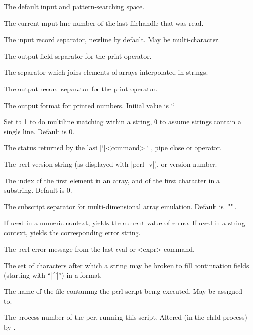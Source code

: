 \begin{enum}{1cm}

The default input and pattern-searching space.

The current input line number of the last filehandle that was read.

The input record separator, newline by default. May be multi-character.

The output field separator for the print operator.

The separator which joins elements of arrays interpolated in strings.

The output record separator for the print operator.

The output format for printed numbers. Initial value is ``|%

Set to 1 to do multiline matching within a string, 0 to assume strings
contain a single line. Default is 0. 

The status returned by the last |`|<command>|`|, pipe close or
 operator. 

The perl version string (as displayed with |perl -v|), or version number.

The index of the first element in an array, and of the first character
in a substring. Default is 0. 

The subscript separator for multi-dimensional array emulation. Default
is |""|. 

If used in a numeric context, yields the current value of errno. If
used in a string context, yields the corresponding error string. 

The perl error message from the last eval or  <expr> command.

The set of characters after which a string may be broken to fill
continuation fields (starting with ``|^|'') in a format. 

The name of the file containing the perl script being executed. May be
assigned to. 

The process number of the perl running this script. Altered (in the
child process) by . 


\end{enum}
